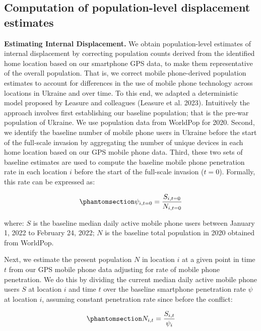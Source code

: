 \documentclass[
  sn-nature,
  11pt,
]{sn-jnl}
\begin{document}
\subsection{Computation of population-level displacement
estimates}\label{sec-methods2.2}

\textbf{Estimating Internal Displacement.} We obtain population-level
estimates of internal displacement by correcting population counts
derived from the identified home location based on our smartphone GPS
data, to make them representative of the overall population. That is, we
correct mobile phone-derived population estimates to account for
differences in the use of mobile phone technology across locations in
Ukraine and over time. To this end, we adapted a deterministic model
proposed by Leasure and colleagues (Leasure et al. 2023). Intuitively
the approach involves first establishing our baseline population; that
is the pre-war population of Ukraine. We use population data from
WorldPop for 2020. Second, we identify the baseline number of mobile
phone users in Ukraine before the start of the full-scale invasion by
aggregating the number of unique devices in each home location based on
our GPS mobile phone data. Third, these two sets of baseline estimates
are used to compute the baseline mobile phone penetration rate in each
location \(i\) before the start of the full-scale invasion (\(t=0\)).
Formally, this rate can be expressed as:

\begin{equation}\phantomsection\label{eq-equation1}{ \psi_{i,t=0} = \frac {S_{i,t=0}} {N_{i,t=0}}}\end{equation}

where: \(S\) is the baseline median daily active mobile phone users
between January 1, 2022 to February 24, 2022; \(N\) is the baseline
total population in 2020 obtained from WorldPop.

Next, we estimate the present population \(N\) in location \(i\) at a
given point in time \(t\) from our GPS mobile phone data adjusting for
rate of mobile phone penetration. We do this by dividing the current
median daily active mobile phone users \(S\) at location \(i\) and time
\(t\) over the baseline smartphone penetration rate \(\psi\) at location
\(i\), assuming constant penetration rate since before the conflict:

\begin{equation}\phantomsection\label{eq-equation2}{ N_{i,t} = \frac {S_{i,t}} {\psi_{i}} }\end{equation}
\end{document}
